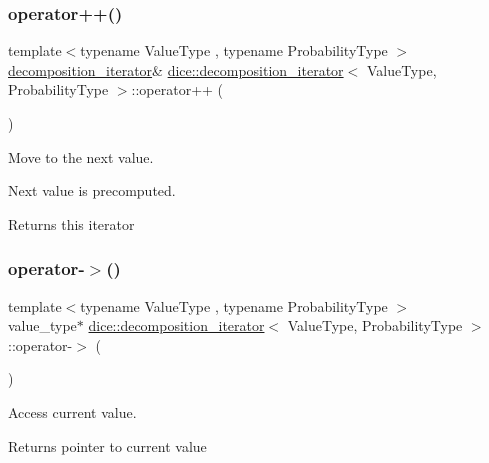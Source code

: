 \subsubsection{\texorpdfstring{operator++()}{operator++()}}
{\footnotesize\ttfamily template$<$typename Value\+Type , typename Probability\+Type $>$ \\
\mbox{\hyperlink{classdice_1_1decomposition__iterator}{decomposition\+\_\+iterator}}\& \mbox{\hyperlink{classdice_1_1decomposition__iterator}{dice\+::decomposition\+\_\+iterator}}$<$ Value\+Type, Probability\+Type $>$\+::operator++ (\begin{DoxyParamCaption}{ }\end{DoxyParamCaption})\hspace{0.3cm}{\ttfamily [inline]}}



Move to the next value. 

Next value is precomputed.

\begin{DoxyReturn}{Returns}
this iterator 
\end{DoxyReturn}
\mbox{\label{classdice_1_1decomposition__iterator_aee9da45888a6249ebada6f9507770bdf}} 
\subsubsection{\texorpdfstring{operator-\/$>$()}{operator->()}}
{\footnotesize\ttfamily template$<$typename Value\+Type , typename Probability\+Type $>$ \\
value\+\_\+type$\ast$ \mbox{\hyperlink{classdice_1_1decomposition__iterator}{dice\+::decomposition\+\_\+iterator}}$<$ Value\+Type, Probability\+Type $>$\+::operator-\/$>$ (\begin{DoxyParamCaption}{ }\end{DoxyParamCaption})\hspace{0.3cm}{\ttfamily [inline]}}



Access current value. 

\begin{DoxyReturn}{Returns}
pointer to current value 
\end{DoxyReturn}
\mbox{\label{classdice_1_1decomposition__iterator_a3a62c8222ebb9b10ea5914e4f58e81f1}} 
